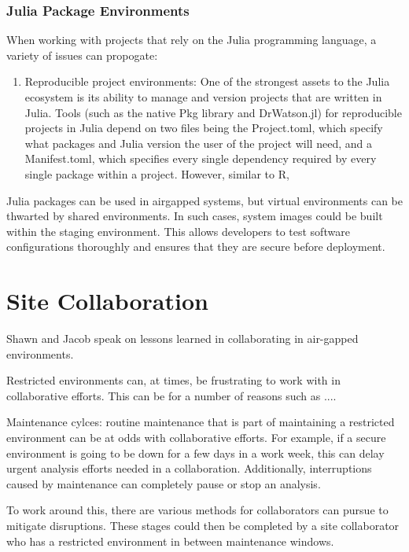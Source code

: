 \documentclass{amia}
\begin{document}
\subsubsection{Julia Package Environments}

When working with projects that rely on the Julia programming language, a variety of issues can propogate:

\begin{enumerate}
	\item Reproducible project environments: One of the strongest assets to the Julia ecosystem is its ability to manage and version projects that are written in Julia. Tools (such as the native Pkg library and DrWatson.jl) for reproducible projects in Julia depend on two files being the Project.toml, which specify what packages and Julia version the user of the project will need, and a Manifest.toml, which specifies every single dependency required by every single package within a project. However, similar to R, 
\end{enumerate}

Julia packages can be used in airgapped systems, but virtual environments can be thwarted by shared environments. In such cases, system images could be built within the staging environment. This allows developers to test software configurations thoroughly and ensures that they are secure before deployment. 

\section*{Site Collaboration}

Shawn and Jacob speak on lessons learned in collaborating in air-gapped environments. 

Restricted environments can, at times, be frustrating to work with in collaborative efforts. This can be for a number of reasons such as ....

Maintenance cylces: routine maintenance that is part of maintaining a restricted environment can be at odds with collaborative efforts. For example, if a secure environment is going to be down for a few days in a work week, this can delay urgent analysis efforts needed in a collaboration. Additionally, interruptions caused by maintenance can completely pause or stop an analysis. 

To work around this, there are various methods for collaborators can pursue to mitigate disruptions. These stages could then be completed by a site collaborator who has a restricted environment in between maintenance windows. 
\end{document}
